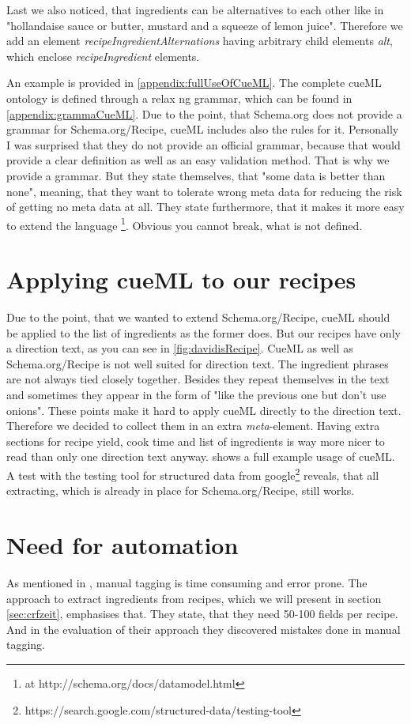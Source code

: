 \documentclass[12pt, twoside]{report}
\begin{document}
Last we also noticed, that ingredients can be alternatives to each other like in "hollandaise sauce or butter, mustard and a squeeze of lemon juice". Therefore we add an element \textit{recipeIngredientAlternations} having arbitrary child elements \textit{alt}, which enclose \textit{recipeIngredient} elements.

An example is provided in \cref{appendix:fullUseOfCueML}. The complete cueML ontology is defined through a relax ng grammar, which can be found in \cref{appendix:grammaCueML}. Due to the point, that Schema.org does not provide a grammar for Schema.org/Recipe, cueML includes also the rules for it. Personally I was surprised that they do not provide an official grammar, because that would provide a clear definition as well as an easy validation method. That is why we provide a grammar. But they state themselves, that "some data is better than none", meaning, that they want to tolerate wrong meta data for reducing the risk of getting no meta data at all. They state furthermore, that it makes it more easy to extend the language \parencite{schemaOrg}\footnote{at http://schema.org/docs/datamodel.html}. Obvious you cannot break, what is not defined. 


\section{Applying cueML to our recipes}
Due to the point, that we wanted to extend Schema.org/Recipe, cueML should be applied to the list of ingredients as the former does. But our recipes have only a direction text, as you can see in \cref{fig:davidisRecipe}. CueML as well as Schema.org/Recipe is not well suited for direction text. The ingredient phrases are not always tied closely together. Besides they repeat themselves in the text and sometimes they appear in the form of "like the previous one but don't use onions". These points make it hard to apply cueML directly to the direction text. Therefore we decided to collect them in an extra \textit{meta}-element. Having extra sections for recipe yield, cook time and list of ingredients is way more nicer to read than only one direction text anyway.  shows a full example usage of cueML. A test with the testing tool for structured data from google\footnote{https://search.google.com/structured-data/testing-tool} reveals, that all extracting, which is already in place for Schema.org/Recipe, still works. 


\section{Need for automation}
As mentioned in \parencite{manualTagging}, manual tagging is time consuming and error prone. The approach to extract ingredients from recipes, which we will present in section \ref{sec:crfzeit}, emphasises that. They state, that they need 50-100 fields per recipe. And in the evaluation of their approach they discovered mistakes done in manual tagging.
\end{document}
